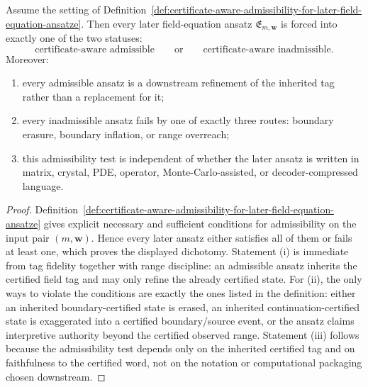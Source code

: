 \begin{proposition}
\label{prop:certificate-aware-field-interface-induces-sharp-admissibility-dichotomy}
Assume the setting of Definition~\ref{def:certificate-aware-admissibility-for-later-field-equation-ansatze}. Then every later field-equation ansatz \(\mathfrak E_{m,\mathbf w}\) is forced into exactly one of the two statuses:
\[
 \text{certificate-aware admissible}
 \qquad\text{or}\qquad
 \text{certificate-aware inadmissible}.
\]
Moreover:
\begin{enumerate}[label=(\roman*)]
 \item every admissible ansatz is a downstream refinement of the inherited tag rather than a replacement for it;
 \item every inadmissible ansatz fails by one of exactly three routes: boundary erasure, boundary inflation, or range overreach;
 \item this admissibility test is independent of whether the later ansatz is written in matrix, crystal, PDE, operator, Monte-Carlo-assisted, or decoder-compressed language.
\end{enumerate}
\end{proposition}

\begin{proof}
Definition~\ref{def:certificate-aware-admissibility-for-later-field-equation-ansatze} gives explicit necessary and sufficient conditions for admissibility on the input pair \((m,\mathbf w)\). Hence every later ansatz either satisfies all of them or fails at least one, which proves the displayed dichotomy. Statement (i) is immediate from tag fidelity together with range discipline: an admissible ansatz inherits the certified field tag and may only refine the already certified state. For (ii), the only ways to violate the conditions are exactly the ones listed in the definition: either an inherited boundary-certified state is erased, an inherited continuation-certified state is exaggerated into a certified boundary/source event, or the ansatz claims interpretive authority beyond the certified observed range. Statement (iii) follows because the admissibility test depends only on the inherited certified tag and on faithfulness to the certified word, not on the notation or computational packaging chosen downstream.
\end{proof}

